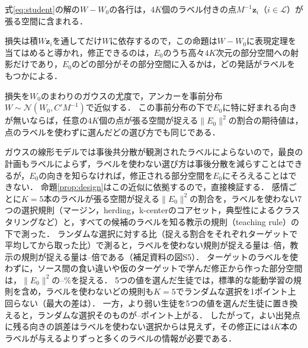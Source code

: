 \begin{proposition}[張る空間]
\label{prop:span}
式\eqref{eq:student}の解の$W - W_0$の各行は，$4K$個のラベル付きの点$M^{-1}\mathbf{z}_i$（$i \in \mathcal{L}$）が張る空間に含まれる．
\end{proposition}

損失は積$W\mathbf{z}_i$を通してだけ$W$に依存するので，この命題は$W - W_0$に表現定理\cite{kimeldorf1971results,scholkopf2001generalized}を当てはめると導かれ，修正できるのは，$E_0$のうち高々$4K$次元の部分空間への射影だけであり，$E_0$のどの部分がその部分空間に入るかは，どの発話がラベルをもつかによる．

\begin{proposition}[ラベルを使わない計画]
\label{prop:design}
損失を$W_0$のまわりのガウスの尤度で，アンカーを事前分布$W \sim \mathcal{N}(W_0, C' M^{-1})$で近似する．
この事前分布の下で$E_0$に特に好まれる向きが無いならば，任意の$4K$個の点が張る空間が捉える$\|E_0\|^2$の割合の期待値は，点のラベルを使わずに選んだどの選び方でも同じである．
\end{proposition}

ガウスの線形モデルでは事後共分散が観測されたラベルによらないので，最良の計画もラベルによらず\cite{chaloner1984optimal,chaloner1995bayesian}，ラベルを使わない選び方は事後分散を減らすことはできるが，$E_0$の向きを知らなければ，修正される部分空間を$E_0$にそろえることはできない．
命題\ref{prop:design}はこの近似に依拠するので，直接検証する．
感情ごとに$K=5$本のラベルが張る空間が捉える$\|E_0\|^2$の割合を，ラベルを使わない7つの選択規則（マージン，herding，k-centerのコアセット，典型性によるクラスタリングなど）と，すべての候補のラベルを知る教示の規則（teaching rule）の下で測った．
ランダムな選択に対する比（捉える割合をそれぞれターゲットで平均してから取った比）で測ると，ラベルを使わない規則が捉える量は--倍，教示の規則が捉える量は--倍である（補足資料の図S5）．
ターゲットのラベルを使わずに，ソース間の食い違いや仮のターゲットで学んだ修正から作った部分空間は，$\|E_0\|^2$の--\%を捉える．
5つの値を選んだ生徒では，標準的な能動学習の規則を含め，ラベルを使わないどの規則も$K=5$でランダムな選択を1ポイント上回らない（最大の差は）．
一方，より弱い生徒を5つの値を選んだ生徒に置き換えると，ランダムな選択そのものが--ポイント上がる．
したがって，よい出発点に残る向きの誤差はラベルを使わない選択からは見えず，その修正には$4K$本のラベルが与えるよりずっと多くのラベルの情報が必要である．

